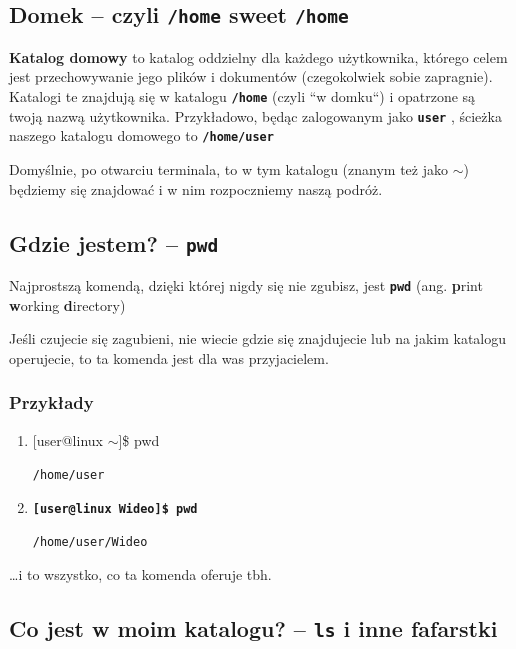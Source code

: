\documentclass[12pt]{article}
\makeatletter
\newcommand{\ttbf}[1]{
    \texttt{\textbf{#1}}
}
\newenvironment{console1}
{
    \ttfamily
    \fontseries{b}
    \selectfont
    {[}user@linux $\sim${]}\$} {

    }
\makeatother
\begin{document}
\subsection{Domek -- czyli \ttbf{/home} sweet \ttbf{/home}}
\label{sec:homedir}

\textbf{Katalog domowy} to katalog oddzielny dla każdego użytkownika, którego celem jest przechowywanie jego plików i dokumentów (czegokolwiek sobie zapragnie). Katalogi te znajdują się w katalogu \ttbf{/home} (czyli ``w domku``) i opatrzone są twoją nazwą użytkownika. Przykładowo, będąc zalogowanym jako \ttbf{user}, ścieżka naszego katalogu domowego to \ttbf{/home/user}

Domyślnie, po otwarciu terminala, to w tym katalogu (znanym też jako $\sim$) będziemy się znajdować i w nim rozpoczniemy naszą podróż.

\subsection{Gdzie jestem? -- \ttbf{pwd}}

Najprostszą komendą, dzięki której nigdy się nie zgubisz, jest \ttbf{pwd} (ang. \textbf{p}rint \textbf{w}orking \textbf{d}irectory)

Jeśli czujecie się zagubieni, nie wiecie gdzie się znajdujecie lub na jakim katalogu operujecie, to ta komenda jest dla was przyjacielem.

\subsubsection{Przykłady}

\begin{enumerate}
    \item \begin{console1}
        pwd
    \end{console1}
    
    \texttt{/home/user}

    \item \ttbf{[user@linux Wideo]\$ pwd}

    \texttt{/home/user/Wideo}
\end{enumerate}

\dots i to wszystko, co ta komenda oferuje tbh.

\subsection{Co jest w moim katalogu? -- \ttbf{ls} i inne fafarstki}
\label{sec:ls}
\end{document}
